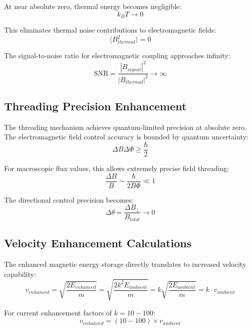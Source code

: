 \documentclass[12pt,a4paper]{article}
\begin{document}
At near absolute zero, thermal energy becomes negligible:
\begin{equation}
k_B T \rightarrow 0
\end{equation}

This eliminates thermal noise contributions to electromagnetic fields:
\begin{equation}
\langle B_{thermal}^2 \rangle = 0
\end{equation}

The signal-to-noise ratio for electromagnetic coupling approaches infinity:
\begin{equation}
\text{SNR} = \frac{|B_{signal}|^2}{|B_{thermal}|^2} \rightarrow \infty
\end{equation}

\subsection{Threading Precision Enhancement}

The threading mechanism achieves quantum-limited precision at absolute zero. The electromagnetic field control accuracy is bounded by quantum uncertainty:
\begin{equation}
\Delta B \Delta \Phi \geq \frac{\hbar}{2}
\end{equation}

For macroscopic flux values, this allows extremely precise field threading:
\begin{equation}
\frac{\Delta B}{B} \sim \frac{\hbar}{2B\Phi} \ll 1
\end{equation}

The directional control precision becomes:
\begin{equation}
\Delta \theta = \frac{\Delta B_{\perp}}{B_{total}} \rightarrow 0
\end{equation}

\subsection{Velocity Enhancement Calculations}

The enhanced magnetic energy storage directly translates to increased velocity capability:
\begin{equation}
v_{enhanced} = \sqrt{\frac{2E_{enhanced}}{m}} = \sqrt{\frac{2k^2 E_{ambient}}{m}} = k \sqrt{\frac{2E_{ambient}}{m}} = k \cdot v_{ambient}
\end{equation}

For current enhancement factors of $k = 10-100$:
\begin{equation}
v_{enhanced} = (10-100) \times v_{ambient}
\end{equation}
\end{document}
